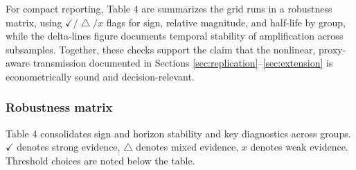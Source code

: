 \documentclass[
  11pt,
]{article}
\begin{document}
For compact reporting, Table 4 are summarizes the grid runs in a robustness matrix, using \(✓/△/x\) flags for sign, relative magnitude, and half-life by group, while the delta-lines figure documents temporal stability of amplification across subsamples. Together, these checks support the claim that the nonlinear, proxy-aware transmission documented in Sections \ref{sec:replication}--\ref{sec:extension} is econometrically sound and decision-relevant.

\subsubsection{Robustness matrix}\label{sec:validationtwoone}

Table 4 consolidates sign and horizon stability and key diagnostics across groups. \(✓\) denotes strong evidence, \(△\) denotes mixed evidence, \(x\) denotes weak evidence. Threshold choices are noted below the table.
\end{document}
